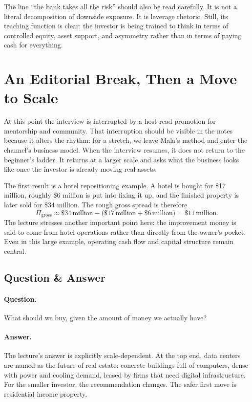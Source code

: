 The line ``the bank takes all the risk'' should also be read carefully. It is not a literal decomposition of downside exposure. It is leverage rhetoric. Still, its teaching function is clear: the investor is being trained to think in terms of controlled equity, asset support, and asymmetry rather than in terms of paying cash for everything.

\section{An Editorial Break, Then a Move to Scale}

At this point the interview is interrupted by a host-read promotion for mentorship and community. That interruption should be visible in the notes because it alters the rhythm: for a stretch, we leave Mala's method and enter the channel's business model. When the interview resumes, it does not return to the beginner's ladder. It returns at a larger scale and asks what the business looks like once the investor is already moving real assets.

The first result is a hotel repositioning example. A hotel is bought for \$17 million, roughly \$6 million is put into fixing it up, and the finished property is later sold for \$34 million. The rough gross spread is therefore
\begin{equation}
\Pi_{\text{gross}} \approx \$34\,\text{million} - \bigl(\$17\,\text{million} + \$6\,\text{million}\bigr) = \$11\,\text{million}.
\end{equation}
The lecture stresses another important point here: the improvement money is said to come from hotel operations rather than directly from the owner's pocket. Even in this large example, operating cash flow and capital structure remain central.

\subsection{Question \& Answer}

\paragraph{Question.} What should we buy, given the amount of money we actually have?

\paragraph{Answer.} The lecture's answer is explicitly scale-dependent. At the top end, data centers are named as the future of real estate: concrete buildings full of computers, dense with power and cooling demand, leased by firms that need digital infrastructure. For the smaller investor, the recommendation changes. The safer first move is residential income property.

